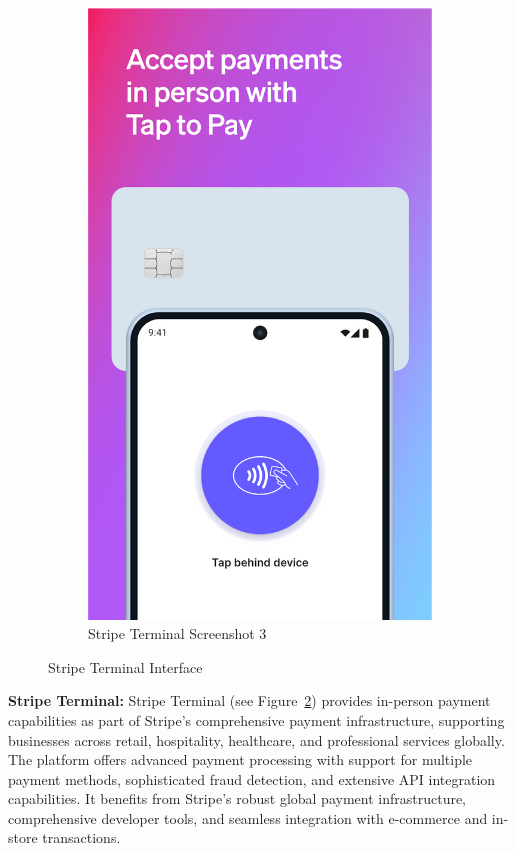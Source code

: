 \begin{figure}[!htb]
\begin{subfigure}[b]{0.32\textwidth}
        \centering
        \includegraphics[width=\textwidth]{images/stripe_screenshot_3.png}
        \caption{Stripe Terminal Screenshot 3}
        \label{fig:stripe_3}
    \end{subfigure}
    \caption{Stripe Terminal Interface}
    \label{fig:stripe_interface}
\end{figure}

\textbf{Stripe Terminal:} Stripe Terminal (see Figure~\ref{fig:stripe_interface}) provides in-person payment capabilities as part of Stripe's comprehensive payment infrastructure, supporting businesses across retail, hospitality, healthcare, and professional services globally. The platform offers advanced payment processing with support for multiple payment methods, sophisticated fraud detection, and extensive API integration capabilities. It benefits from Stripe's robust global payment infrastructure, comprehensive developer tools, and seamless integration with e-commerce and in-store transactions.

